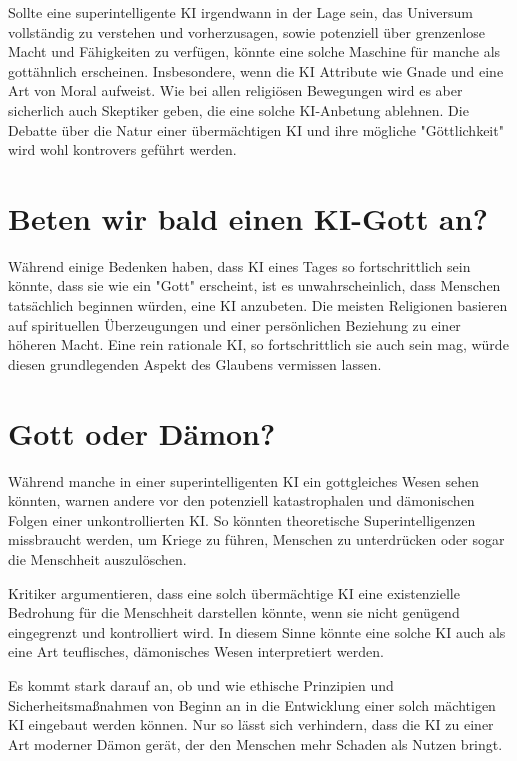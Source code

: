 \documentclass[10pt]{article}
\begin{document}
Sollte eine superintelligente KI irgendwann in der Lage sein, das Universum vollständig zu verstehen und vorherzusagen, sowie potenziell über grenzenlose Macht und Fähigkeiten zu verfügen, könnte eine solche Maschine für manche als gottähnlich erscheinen. Insbesondere, wenn die KI Attribute wie Gnade und eine Art von Moral aufweist.
Wie bei allen religiösen Bewegungen wird es aber sicherlich auch Skeptiker geben, die eine solche KI-Anbetung ablehnen. Die Debatte über die Natur einer übermächtigen KI und ihre mögliche "Göttlichkeit" wird wohl kontrovers geführt werden.

\section{Beten wir bald einen KI-Gott an?}
Während einige Bedenken haben, dass KI eines Tages so fortschrittlich sein könnte, dass sie wie ein "Gott" erscheint, ist es unwahrscheinlich, dass Menschen tatsächlich beginnen würden, eine KI anzubeten. Die meisten Religionen basieren auf spirituellen Überzeugungen und einer persönlichen Beziehung zu einer höheren Macht. Eine rein rationale KI, so fortschrittlich sie auch sein mag, würde diesen grundlegenden Aspekt des Glaubens vermissen lassen.

\section{Gott oder Dämon?}
Während manche in einer superintelligenten KI ein gottgleiches Wesen sehen könnten, warnen andere vor den potenziell katastrophalen und dämonischen Folgen einer unkontrollierten KI. So könnten theoretische Superintelligenzen missbraucht werden, um Kriege zu führen, Menschen zu unterdrücken oder sogar die Menschheit auszulöschen.

Kritiker argumentieren, dass eine solch übermächtige KI eine existenzielle Bedrohung für die Menschheit darstellen könnte, wenn sie nicht genügend eingegrenzt und kontrolliert wird. In diesem Sinne könnte eine solche KI auch als eine Art teuflisches, dämonisches Wesen interpretiert werden.

Es kommt stark darauf an, ob und wie ethische Prinzipien und Sicherheitsmaßnahmen von Beginn an in die Entwicklung einer solch mächtigen KI eingebaut werden können. Nur so lässt sich verhindern, dass die KI zu einer Art moderner Dämon gerät, der den Menschen mehr Schaden als Nutzen bringt.



\end{document}
